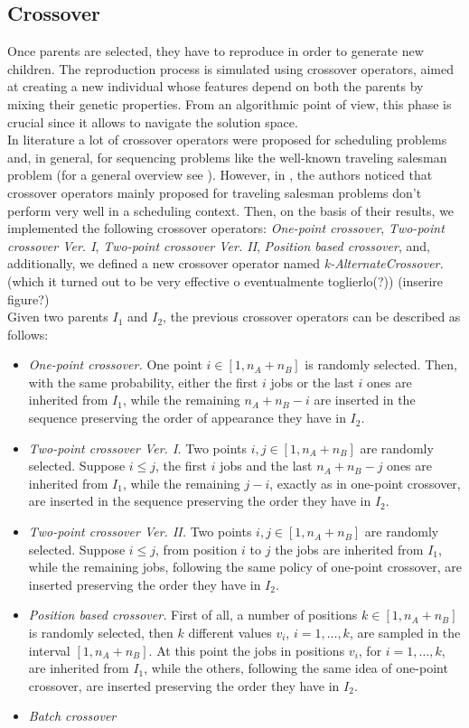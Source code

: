 \documentclass[opre,nonblindrev]{informs3} %
\begin{document}
\subsection{Crossover}
Once parents are selected, they have to reproduce in order to generate new children. The reproduction process is simulated using crossover operators, aimed at creating a new individual whose features depend on both the parents by mixing their genetic properties. From an algorithmic point of view, this phase is crucial since it allows to navigate the solution space. \\
In literature a lot of crossover operators were proposed for scheduling problems and, in general, for sequencing problems like the well-known traveling salesman problem (for a general overview see \cite{cross1}). However, in \cite{sched1}, the authors noticed that crossover operators mainly proposed for traveling salesman problems don't perform very well in a scheduling context. Then, on the basis of their results, we implemented the following crossover operators: \textit{One-point crossover}, \textit{Two-point crossover Ver. I}, \textit{Two-point crossover Ver. II}, \textit{Position based crossover}, and, additionally, we defined a new crossover operator named \textit{k-AlternateCrossover.} (which it turned out to be very effective o eventualmente toglierlo(?)) (inserire figure?)\\
Given two parents $I_1$ and $I_2$, the previous crossover operators can be described as follows: 
\begin{itemize}
	\item \textit{One-point crossover.} One point $i \in [1,n_A+n_B]$ is randomly selected. Then, with the same probability, either the first $i$ jobs or the last $i$ ones are inherited from $I_1$, while the remaining $n_A+n_B-i$ are inserted in the sequence preserving the order of appearance they have in $I_2$. 
	\item \textit{Two-point crossover Ver. I.} Two points $i,j \in [1,n_A+n_B]$ are randomly selected. Suppose $i \le j$, the first $i$ jobs and the last $n_A+n_B-j$ ones are inherited from $I_1$, while the remaining $j-i$, exactly as in one-point crossover, are inserted in the sequence preserving the order they have in $I_2$.
	\item \textit{Two-point crossover Ver. II.} Two points $i,j \in [1,n_A+n_B]$ are randomly selected. Suppose $i \le j$, from position $i$ to $j$ the jobs are inherited from $I_1$, while the remaining jobs, following the same policy of one-point crossover, are inserted preserving the order they have in $I_2$.
	\item \textit{Position based crossover.} First of all, a number of positions $k \in [1,n_A+n_B]$ is randomly selected, then $k$ different values $v_i$, $i=1,\ldots,k$, are sampled in the interval $[1,n_A+n_B].$ At this point the jobs in positions $v_i$, for $i=1,\ldots,k$, are inherited from $I_1$, while the others, following the same idea of one-point crossover, are inserted preserving the order they have in $I_2$.
	\item \textit{Batch crossover}
\end{itemize}
\end{document}
